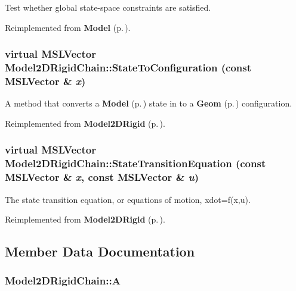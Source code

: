 Test whether global state-space constraints are satisfied.



Reimplemented from {\bf Model} {\rm (p.\,\pageref{class_Model_a4})}.
\subsubsection{\setlength{\rightskip}{0pt plus 5cm}virtual {\bf MSLVector} Model2DRigid\-Chain::State\-To\-Configuration (const {\bf MSLVector} \& {\em x})\hspace{0.3cm}{\tt  [virtual]}}\label{class_Model2DRigidChain_a2}


A method that converts a {\bf Model} {\rm (p.\,\pageref{class_Model})} state in to a {\bf Geom} {\rm (p.\,\pageref{class_Geom})} configuration.



Reimplemented from {\bf Model2DRigid} {\rm (p.\,\pageref{class_Model2DRigid_a6})}.
\subsubsection{\setlength{\rightskip}{0pt plus 5cm}virtual {\bf MSLVector} Model2DRigid\-Chain::State\-Transition\-Equation (const {\bf MSLVector} \& {\em x}, const {\bf MSLVector} \& {\em u})\hspace{0.3cm}{\tt  [virtual]}}\label{class_Model2DRigidChain_a3}


The state transition equation, or equations of motion, xdot=f(x,u).



Reimplemented from {\bf Model2DRigid} {\rm (p.\,\pageref{class_Model2DRigid_a3})}.

\subsection{Member Data Documentation}
\subsubsection{ Model2DRigid\-Chain::A}\label{class_Model2DRigidChain_m1}



